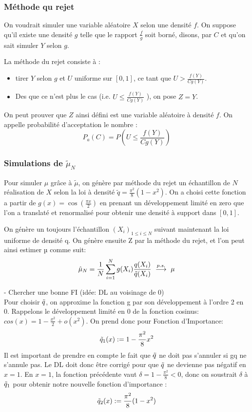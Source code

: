 \documentclass{article}
\begin{document}
\subsubsection{Méthode qu rejet}
 On voudrait simuler une variable aléatoire $X$
 selon une densité $f$.
 On suppose qu'il existe une densité $g$ telle que le rapport $\frac{f}{g}$ soit borné, disons, par $C$ et qu'on 
 sait simuler $Y$ selon $g$.

 La méthode du rejet consiste à :
 \begin{itemize}
   \item tirer $Y$ selon $g$ et $U$ uniforme sur $[0,1]$,
ce tant que $U>\frac{f(Y)}{Cg(Y)}$. 
   \item Des que ce n'est plus le cas (i.e. $U\leq \frac{f(Y)}{Cg(Y)}$ ), on pose $Z=Y$.
\end{itemize}
On peut prouver que $Z$ ainsi défini est une variable aléatoire à densité $f$.
On appelle probabilité d'acceptation le nombre :
\[P_{a}(C)=P(U\leq \frac{f(Y)}{Cg(Y)})\]
\subsubsection{Simulations de $\tilde{\mu}_{N}$}

Pour simuler $\mu$ grâce à $\tilde{\mu}$, on génère par méthode du rejet un échantillon de $N$
réalisation de $X$ selon la loi à densité $\tilde{q} = \frac{\pi^2}{8}(1 - x^2)  $. On a choisi cette
fonction a partir de $g(x)= \cos (\frac{\pi x}{2})$  en prenant un développement
limité en zero que l'on a translaté et renormalisé pour obtenir une densité à 
support dans $[0,1]$.




On génère un toujours l'échantillon $(X_i)_{1\leq i \leq N}$ suivant maintenant la loi uniforme de densité q. On génère ensuite Z par la méthode du rejet, et l'on peut ainsi estimer µ comme suit: 
$$ \hat{\mu}_N = \frac1{N} \sum_{i=1}^N g(X_i)\frac{q(X_i)}{\Tilde{q}(X_i)}\ \overset{p.s.}{\longrightarrow}\ \mu $$

- Chercher une bonne FI (idée: DL au voisinage de 0)  \\
Pour choisir $\Tilde{q}$, on approxime la fonction g par son développement à l'ordre 2 en 0. Rappelons le développement limité en 0 de la fonction cosinus: 
$ cos(x) = 1 - \frac{x^2}{2} + o(x^2) $.
On prend donc pour Fonction d'Importance: 
$$\Tilde{q}_1(x):= 1 - \frac{\pi^2}{8} x^2 $$
Il est important de prendre en compte le fait que $\Tilde{q}$ ne doit pas s'annuler si gq ne s'annule pas. Le DL doit donc être corrigé pour que $\Tilde{q}$ ne devienne pas négatif en $x=1$. En $x=1$, la fonction précédente vaut $\delta = 1 - \frac{\pi^2}{8} < 0$, donc on soustrait $\delta$ à $\Tilde{q}_1$ pour obtenir notre nouvelle fonction d'importance :
$$\Tilde{q}_2(x):= \frac{\pi^2}{8}(1 - x^2) $$
\end{document}
